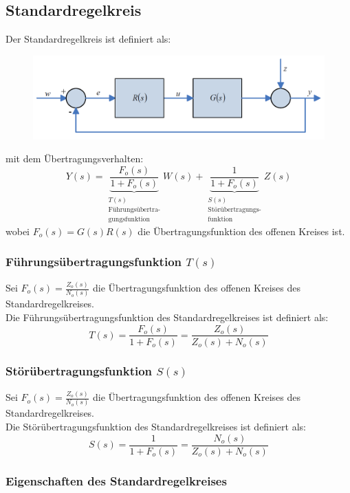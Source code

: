 \documentclass[10pt,a4paper]{article}
\begin{document}
\subsection{Standardregelkreis}
Der Standardregelkreis ist definiert als:
\begin{figure}[H]
	\includegraphics[width = \columnwidth]{imgs/standardregelkreis_2.png}
\end{figure}
mit dem Übertragungsverhalten:
$$
	Y(s) =\underbrace{ \frac{F_o(s)}{1 + F_o(s)}}_{\substack{T(s) \\ \text{Führungsübertra-} \\ \text{gungsfunktion}}} W(s) + \underbrace{\frac{1}{1 + F_o(s)}}_{\substack{S(s) \\ \text{Störübertragungs-} \\ \text{funktion}}} Z(s)
$$
wobei $F_o(s) = G(s)R(s)$ die Übertragungsfunktion des offenen Kreises ist.

\subsubsection{Führungsübertragungsfunktion $T(s)$}
Sei $F_o(s) = \frac{Z_o(s)}{N_o(s)}$ die Übertragungsfunktion des offenen Kreises des Standardregelkreises. \\
Die Führungsübertragungsfunktion des Standardregelkreises ist definiert als:
$$
	T(s) = \frac{F_o(s)}{1 + F_o(s)} = \frac{Z_o(s)}{Z_o(s) + N_o(s)}
$$

\subsubsection{Störübertragungsfunktion $S(s)$}
Sei $F_o(s) = \frac{Z_o(s)}{N_o(s)}$ die Übertragungsfunktion des offenen Kreises des Standardregelkreises. \\
Die Störübertragungsfunktion des Standardregelkreises ist definiert als:
$$
	S(s) = \frac{1}{1 + F_o(s)} = \frac{N_o(s)}{Z_o(s) + N_o(s)}
$$

\subsubsection{Eigenschaften des Standardregelkreises}
\end{document}
